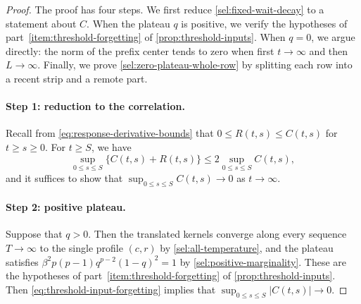 \begin{proof}
The proof has four steps. We first reduce \eqref{sel:fixed-wait-decay} to a statement about $C$. When the plateau $q$ is positive, we verify the hypotheses of part~\ref{item:threshold-forgetting} of \cref{prop:threshold-inputs}. When $q=0$, we argue directly: the norm of the prefix center tends to zero when first $t\to\infty$ and then $L\to\infty$. Finally, we prove \eqref{sel:zero-plateau-whole-row} by splitting each row into a recent strip and a remote part.

\paragraph{Step 1: reduction to the correlation.}
Recall from \eqref{eq:response-derivative-bounds} that $0\le R(t,s)\le C(t,s)$ for $t\ge s\ge0$. For $t\ge S$, we have
\[
 \sup_{0\le s\le S}\bigl\{C(t,s)+R(t,s)\bigr\}\le2\sup_{0\le s\le S}C(t,s),
\]
and it suffices to show that $\sup_{0\le s\le S}C(t,s)\to0$ as $t\to\infty$.

\paragraph{Step 2: positive plateau.}
Suppose that $q>0$. Then the translated kernels converge along every sequence $T\to\infty$ to the single profile $(c,r)$ by \cref{sel:all-temperature}, and the plateau satisfies $\beta^2p(p-1)q^{p-2}(1-q)^2=1$ by \cref{sel:positive-marginality}. These are the hypotheses of part~\ref{item:threshold-forgetting} of \cref{prop:threshold-inputs}. Then \eqref{eq:threshold-input-forgetting} implies that $\sup_{0\le s\le S}|C(t,s)|\to0$.


\end{proof}
